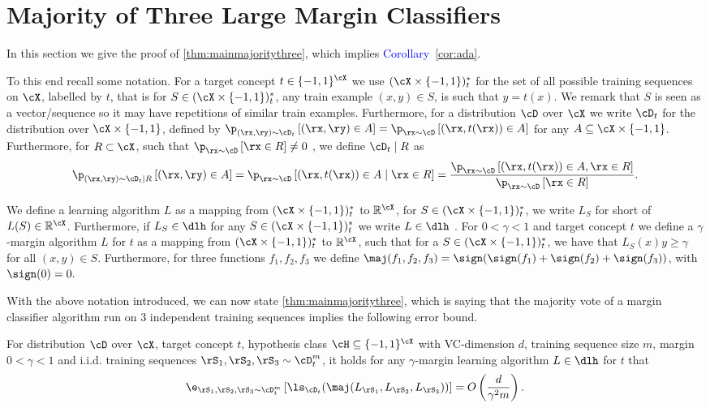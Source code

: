 \section{Majority of Three Large Margin Classifiers}\label{sec:mainmajoritythree}
In this section we give the proof of \cref{thm:mainmajoritythree}, which implies \textcolor{blue}{Corollary}~\ref{cor:ada}. 

To this end recall some notation. For a target concept $ t \in \{  -1,1\}^{\cX}  $ we use $ (\cX\times\{  -1,1\})_{t}^{*} $ for the set of all possible training sequences on $ \cX $, labelled by $ t $, that is for $ S\in (\cX\times\{  -1,1\})_{t}^{*} $, any train example $ (x,y)\in S $, is such that $ y=t(x).$ We remark that $ S $ is seen as a vector/sequence so it may have repetitions of similar train examples. Furthermore, for a distribution $ \cD $ over $ \cX $ we write $ \cD_{t} $ for the distribution over $ \cX\times\{  -1,1\}  $, defined by $ \p_{(\rx,\ry)\sim\cD_{t}}\left[(\rx,\ry)\in A\right]=\p_{\rx\sim \cD}\left[(\rx,t(\rx))\in A\right] $ for any  $ A\subseteq \cX\times\{  -1,1\}$. Furthermore, for $ R\subset \cX $, such that $ \p_{\rx\sim\cD}\left[\rx\in R\right]\not=0 $ , we define $ \cD_{t}\mid R $ as $$ \p_{(\rx,\ry)\sim\cD_{t}\mid R}\left[(\rx,\ry)\in A\right]=\p_{\rx\sim \cD}\left[(\rx,t(\rx))\in A\mid \rx\in R\right]= \frac{\p_{\rx\sim \cD}\left[(\rx,t(\rx))\in A, \rx\in R\right]}{\p_{\rx\sim \cD}\left[\rx\in R\right]}.$$

We define a learning algorithm $ L $  as a mapping from $ (\cX\times\{  -1,1\})_{t}^{*} $ to $ \mathbb{R}^{\cX} $, for $ S\in (\cX\times\{  -1,1\})_{t}^{*} $, we write $ L_{S} $ for short of $ L(S)\in\mathbb{R}^{\cX} $. Furthermore, if $ L_{S} \in \dlh$ for any $ S\in (\cX\times\{  -1,1\})_{t}^{*} $ we write $ L\in \dlh $ . For $ 0<\gamma<1 $ and target concept $ t $  we define a $ \gamma $-margin algorithm $ L $ for $ t $   as a mapping from $ (\cX\times\{  -1,1\})_{t}^{*} $ to $ \mathbb{R}^{\cX} $, such that for a $ S\in (\cX\times\{  -1,1\})_{t}^{*} $, we have that $ L_{S}(x)y\geq \gamma $ for all $ (x,y)\in S.$ Furthermore, for three functions $ f_{1},f_{2},f_{3} $ we define $ \maj(f_{1},f_{2},f_{3})=\sign(\sign(f_{1})+\sign(f_{2})+\sign(f_{3})) $, with $ \sign(0)=0.$  

 With the above notation introduced, we can now state \cref{thm:mainmajoritythree}, which is saying that the majority vote of a margin classifier algorithm run on 3 independent training sequences implies the following error bound.
\begin{theorem}\label{thm:mainmajoritythree}
    For distribution $ \cD $ over $ \cX $, target concept $ t $,  hypothesis class $ \cH \subseteq \{-1,1  \}^{\cX} $ with VC-dimension $ d $,  training sequence size $ m $, margin $ 0<\gamma<1 $ and i.i.d. training sequences $ \rS_{1},\rS_{2},\rS_{3}\sim \cD_{t}^{m} $, it holds for any $ \gamma $-margin learning algorithm $ L\in \dlh $ for $ t $ that  
    \begin{align*}
    \e_{\rS_{1},\rS_{2},\rS_{3}\sim \cD^{m}_{t}}\left[\ls_{\cD_{t}}(\maj(L_{\rS_{1}},L_{\rS_{2}},L_{\rS_{3}}))\right] =O\left(\frac{d}{\gamma^{2}m}\right).
    \end{align*}
\end{theorem}

